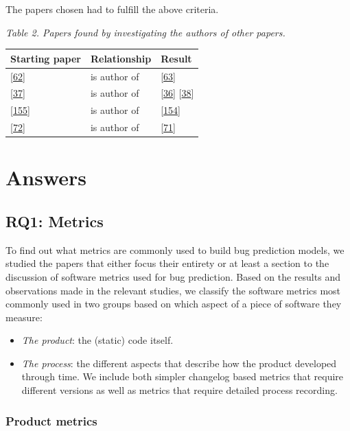 \documentclass[]{book}
\providecommand{\tightlist}{%
  \setlength{\itemsep}{0pt}\setlength{\parskip}{0pt}}
\begin{document}
The papers chosen had to fulfill the above criteria.

\emph{Table 2. Papers found by investigating the authors of other
papers.}

\begin{longtable}[]{@{}lll@{}}
\toprule
Starting paper & Relationship & Result\tabularnewline
\midrule
\endhead
{[}\protect\hyperlink{ref-DAmbros2010}{62}{]} & is author of &
{[}\protect\hyperlink{ref-DAmbros2012}{63}{]}\tabularnewline
{[}\protect\hyperlink{ref-Catal2009review}{37}{]} & is author of &
{[}\protect\hyperlink{ref-Catal2011}{36}{]}
{[}\protect\hyperlink{ref-Catal2009investigating}{38}{]}\tabularnewline
{[}\protect\hyperlink{ref-rahman2011}{155}{]} & is author of &
{[}\protect\hyperlink{ref-Rahman2013}{154}{]}\tabularnewline
{[}\protect\hyperlink{ref-Giger2011}{72}{]} & is author of &
{[}\protect\hyperlink{ref-giger2012}{71}{]}\tabularnewline
\bottomrule
\end{longtable}

\section{Answers}\label{answers-1}

\subsection{RQ1: Metrics}\label{rq1-metrics}

To find out what metrics are commonly used to build bug prediction
models, we studied the papers that either focus their entirety or at
least a section to the discussion of software metrics used for bug
prediction. Based on the results and observations made in the relevant
studies, we classify the software metrics most commonly used in two
groups based on which aspect of a piece of software they measure:

\begin{itemize}
\tightlist
\item
  \emph{The product}: the (static) code itself.
\item
  \emph{The process}: the different aspects that describe how the
  product developed through time. We include both simpler changelog
  based metrics that require different versions as well as metrics that
  require detailed process recording.
\end{itemize}

\subsubsection{Product metrics}\label{product-metrics}
\end{document}
